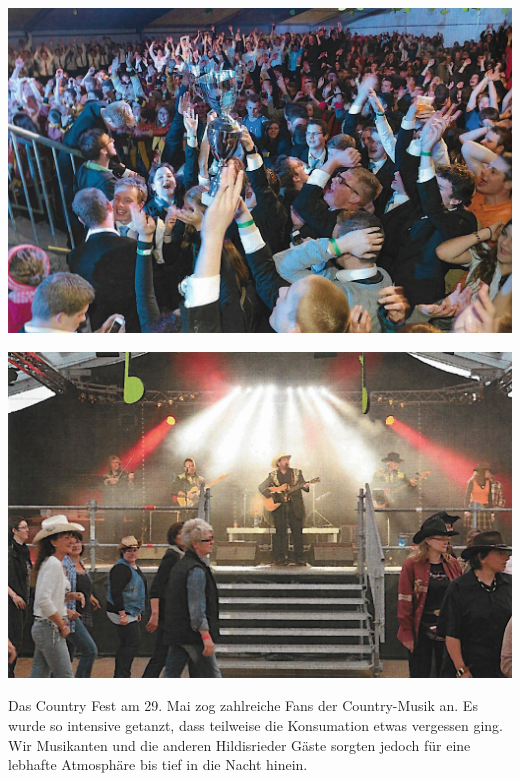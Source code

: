 \begin{history}
    \begin{MulticolFigure}
        \centering
        \includegraphics[width=0.93\linewidth]{./chap/2001-2024/2013/Jugendmusikfest.jpg}
    \end{MulticolFigure}
    \begin{MulticolFigure}
        \centering
        \includegraphics[width=0.93\linewidth]{./chap/2001-2024/2013/Country.jpg}
    \end{MulticolFigure}

    Das Country Fest am 29. Mai zog zahlreiche Fans der Country-Musik an. Es
    wurde so intensive getanzt, dass teilweise die Konsumation etwas vergessen
    ging. Wir Musikanten und die anderen Hildisrieder Gäste sorgten jedoch für
    eine lebhafte Atmosphäre bis tief in die Nacht hinein.


\end{history}
